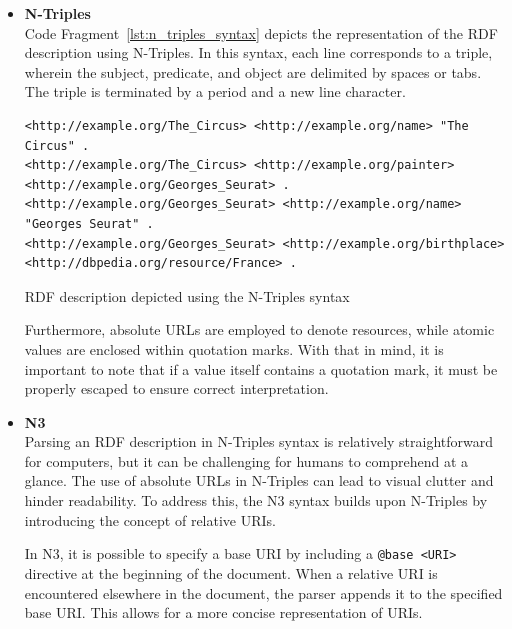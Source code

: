\begin{itemize}

    \item \textbf{N-Triples}\\
    Code Fragment~\ref{lst:n_triples_syntax} depicts the representation of the RDF description using N-Triples. In this syntax, each line corresponds to a triple, wherein the subject, predicate, and object are delimited by spaces or tabs. The triple is terminated by a period and a new line character. \citep{seaborne2014rdf}

    \begin{listing}[htbp]
        \begin{verbatim}
<http://example.org/The_Circus> <http://example.org/name> "The Circus" .
<http://example.org/The_Circus> <http://example.org/painter> <http://example.org/Georges_Seurat> .
<http://example.org/Georges_Seurat> <http://example.org/name> "Georges Seurat" .
<http://example.org/Georges_Seurat> <http://example.org/birthplace> <http://dbpedia.org/resource/France> .
        \end{verbatim}
        \caption{RDF description depicted using the N-Triples syntax}
        \label{lst:n_triples_syntax}
    \end{listing}
    
    Furthermore, absolute URLs are employed to denote resources, while atomic values are enclosed within quotation marks. With that in mind, it is important to note that if a value itself contains a quotation mark, it must be properly escaped to ensure correct interpretation. \citep{seaborne2014rdf}

    \item \textbf{N3}\\
    Parsing an RDF description in N-Triples syntax is relatively straightforward for computers, but it can be challenging for humans to comprehend at a glance. The use of absolute URLs in N-Triples can lead to visual clutter and hinder readability. To address this, the N3 syntax builds upon N-Triples by introducing the concept of relative URIs. \citep{seaborne2014rdf}

    In N3, it is possible to specify a base URI by including a \texttt{@base <URI>} directive at the beginning of the document. When a relative URI is encountered elsewhere in the document, the parser appends it to the specified base URI. This allows for a more concise representation of URIs. \citep{berners2011notation3}


\end{itemize}
